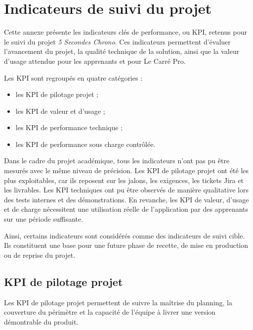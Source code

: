 \chapter{Indicateurs de suivi du projet}
\label{annexe:kpi-projet}

Cette annexe présente les indicateurs clés de performance, ou KPI, retenus pour le suivi du projet \emph{5 Secondes Chrono}. 
Ces indicateurs permettent d'évaluer l'avancement du projet, la qualité technique de la solution, ainsi que la valeur d'usage attendue pour les apprenants et pour Le Carré Pro.

Les KPI sont regroupés en quatre catégories :
\begin{itemize}\setlength{\itemsep}{2pt}
    \item les KPI de pilotage projet ;
    \item les KPI de valeur et d'usage ;
    \item les KPI de performance technique ;
    \item les KPI de performance sous charge contrôlée.
\end{itemize}

Dans le cadre du projet académique, tous les indicateurs n'ont pas pu être mesurés avec le même niveau de précision. 
Les KPI de pilotage projet ont été les plus exploitables, car ils reposent sur les jalons, les exigences, les tickets Jira et les livrables. 
Les KPI techniques ont pu être observés de manière qualitative lors des tests internes et des démonstrations. 
En revanche, les KPI de valeur, d'usage et de charge nécessitent une utilisation réelle de l'application par des apprenants sur une période suffisante.

Ainsi, certains indicateurs sont considérés comme des indicateurs de suivi cible. 
Ils constituent une base pour une future phase de recette, de mise en production ou de reprise du projet.

\section{KPI de pilotage projet}

Les KPI de pilotage projet permettent de suivre la maîtrise du planning, la couverture du périmètre et la capacité de l'équipe à livrer une version démontrable du produit.

